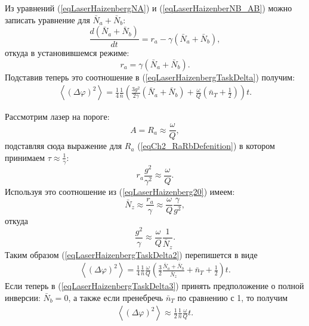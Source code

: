 Из уравнений (\ref{eqLaserHaizenbergNA}) и 
(\ref{eqLaserHaizenberNB_AB}) можно записать уравнение для
$\bar{N}_a+\bar{N}_b$: 
\begin{equation}
\frac{d\left(\bar{N}_a+\bar{N}_b\right)}{d t} = r_a - \gamma
\left(\bar{N}_a+\bar{N}_b\right), 
\nonumber
\end{equation}
откуда в установившемся режиме:
\begin{equation}
r_a = \gamma
\left(\bar{N}_a+\bar{N}_b\right).
\nonumber
\end{equation}
Подставив теперь это соотношение в (\ref{eqLaserHaizenbergTaskDelta})
получим: 
\begin{eqnarray}
\left<\left(\Delta \varphi\right)^2\right> = 
\frac{1}{4}\frac{1}{\bar{n}}
\left(
\frac{3 g^2}{2\gamma}\left(\bar{N}_a + \bar{N}_b\right) + 
\frac{\omega}{Q}\left(\bar{n}_T + \frac{1}{2}\right)
\right) t.
\label{eqLaserHaizenbergTaskDelta2}
\end{eqnarray}

Рассмотрим лазер на пороге:
\begin{equation}
A=R_a\approx \frac{\omega}{Q},
\nonumber
\end{equation}
подставляя сюда выражение для $R_a$ (\ref{eqCh2_RaRbDefenition}) в
котором принимаем $\tau \approx \frac{1}{\gamma}$:
\begin{equation}
r_a \frac{g^2}{\gamma^2} \approx \frac{\omega}{Q}.
\nonumber 
\end{equation}
Используя это соотношение из (\ref{eqLaserHaizenberg20}) имеем:
\begin{equation}
\bar{N}_z \approx
\frac{r_a}{\gamma} \approx \frac{\omega}{Q} \frac{\gamma}{g^2},
\nonumber
\end{equation}
откуда
\begin{equation}
\frac{g^2}{\gamma} \approx
\frac{\omega}{Q}\frac{1}{\bar{N}_z}.
\nonumber
\end{equation}
Таким образом (\ref{eqLaserHaizenbergTaskDelta2}) перепишется в виде
\begin{eqnarray}
\left<\left(\Delta \varphi\right)^2\right> = 
\frac{1}{4}\frac{1}{\bar{n}}\frac{\omega}{Q}
\left(
\frac{3}{2}\frac{\bar{N}_a + \bar{N}_b}{\bar{N}_z} + 
\bar{n}_T + \frac{1}{2}
\right) t.
\label{eqLaserHaizenbergTaskDelta3}
\end{eqnarray}
Если теперь в (\ref{eqLaserHaizenbergTaskDelta3}) принять
предположение о полной инверсии: $\bar{N}_b = 0$, а также если
пренебречь $\bar{n}_T$ по сравнению с 1, то получим
\begin{eqnarray}
\left<\left(\Delta \varphi\right)^2\right> \approx
\frac{1}{2}\frac{1}{\bar{n}}\frac{\omega}{Q} t.
\label{eqLaserHaizenbergTaskDelta4}
\end{eqnarray}

